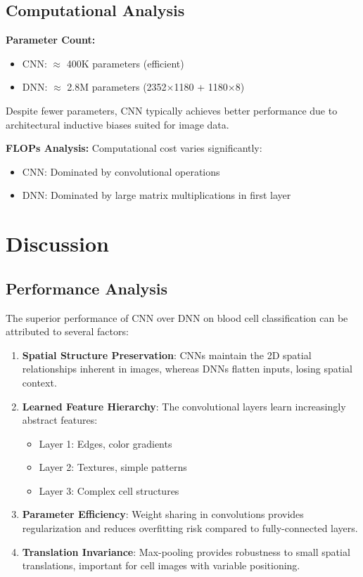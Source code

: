 \documentclass[runningheads]{llncs}
\begin{document}
\subsection{Computational Analysis}

\textbf{Parameter Count:}
\begin{itemize}
    \item CNN: $\approx$ 400K parameters (efficient)
    \item DNN: $\approx$ 2.8M parameters (2352$\times$1180 + 1180$\times$8)
\end{itemize}

Despite fewer parameters, CNN typically achieves better performance due to architectural inductive biases suited for image data.

\textbf{FLOPs Analysis:}
Computational cost varies significantly:
\begin{itemize}
    \item CNN: Dominated by convolutional operations
    \item DNN: Dominated by large matrix multiplications in first layer
\end{itemize}

\section{Discussion}

\subsection{Performance Analysis}

The superior performance of CNN over DNN on blood cell classification can be attributed to several factors:

\begin{enumerate}
    \item \textbf{Spatial Structure Preservation}: CNNs maintain the 2D spatial relationships inherent in images, whereas DNNs flatten inputs, losing spatial context.
    
    \item \textbf{Learned Feature Hierarchy}: The convolutional layers learn increasingly abstract features:
    \begin{itemize}
        \item Layer 1: Edges, color gradients
        \item Layer 2: Textures, simple patterns
        \item Layer 3: Complex cell structures
    \end{itemize}
    
    \item \textbf{Parameter Efficiency}: Weight sharing in convolutions provides regularization and reduces overfitting risk compared to fully-connected layers.
    
    \item \textbf{Translation Invariance}: Max-pooling provides robustness to small spatial translations, important for cell images with variable positioning.
\end{enumerate}
\end{document}
